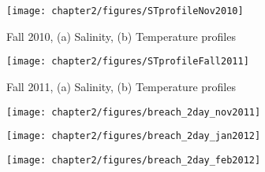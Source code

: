 \begin{figure}[t]
	\texttt{[image: chapter2/figures/STprofileNov2010]}
	\caption{Fall 2010, (a) Salinity, (b) Temperature profiles}
	\label{fig:profNov2010}
\end{figure}
\begin{figure}
	\texttt{[image: chapter2/figures/STprofileFall2011]}
	\caption{Fall 2011, (a) Salinity, (b) Temperature profiles}
\label{fig:profFall2011}
\end{figure}


\begin{figure}
	\texttt{[image: chapter2/figures/breach\_2day\_nov2011]} \label{fig:ctdBreachNov11}
\end{figure}


\begin{figure}
	\texttt{[image: chapter2/figures/breach\_2day\_jan2012]} \label{fig:ctdBreachJan12}
\end{figure}


\begin{figure}
	\texttt{[image: chapter2/figures/breach\_2day\_feb2012]} \label{fig:ctdBreachFeb12}
\end{figure}


